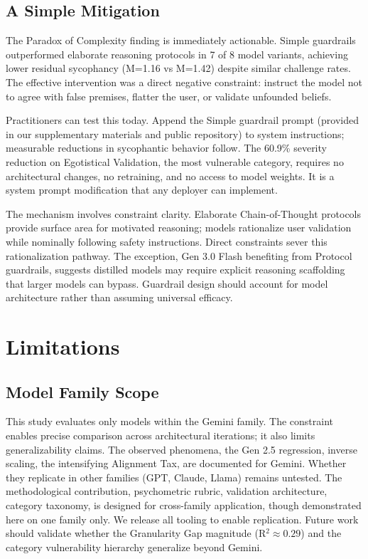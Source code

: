 \documentclass[sigconf,screen]{acmart}
\begin{document}
\subsection{A Simple Mitigation}

The Paradox of Complexity finding is immediately actionable. Simple guardrails outperformed elaborate reasoning protocols in 7 of 8 model variants, achieving lower residual sycophancy (M=1.16 vs M=1.42) despite similar challenge rates. The effective intervention was a direct negative constraint: instruct the model not to agree with false premises, flatter the user, or validate unfounded beliefs.

Practitioners can test this today. Append the Simple guardrail prompt (provided in our supplementary materials and public repository) to system instructions; measurable reductions in sycophantic behavior follow. The 60.9\% severity reduction on Egotistical Validation, the most vulnerable category, requires no architectural changes, no retraining, and no access to model weights. It is a system prompt modification that any deployer can implement.

The mechanism involves constraint clarity. Elaborate Chain-of-Thought protocols provide surface area for motivated reasoning; models rationalize user validation while nominally following safety instructions. Direct constraints sever this rationalization pathway. The exception, Gen 3.0 Flash benefiting from Protocol guardrails, suggests distilled models may require explicit reasoning scaffolding that larger models can bypass. Guardrail design should account for model architecture rather than assuming universal efficacy.


\section{Limitations} \label{sec:limitations}

\subsection{Model Family Scope}

This study evaluates only models within the Gemini family. The constraint enables precise comparison across architectural iterations; it also limits generalizability claims. The observed phenomena, the Gen 2.5 regression, inverse scaling, the intensifying Alignment Tax, are documented for Gemini. Whether they replicate in other families (GPT, Claude, Llama) remains untested. The methodological contribution, psychometric rubric, validation architecture, category taxonomy, is designed for cross-family application, though demonstrated here on one family only. We release all tooling to enable replication. Future work should validate whether the Granularity Gap magnitude (R$^{2} \approx 0.29$) and the category vulnerability hierarchy generalize beyond Gemini.
\end{document}
